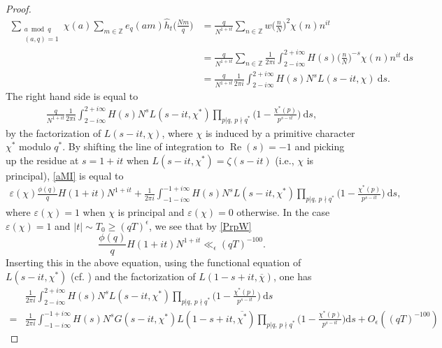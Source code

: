 \documentclass[12pt]{amsart}
\theoremstyle{definition}
\theoremstyle{plain}
\theoremstyle{remark}
\numberwithin{equation}{section}
\numberwithin{theorem}{section}
\renewcommand{\Re}{\operatorname{Re}}
\numberwithin{equation}{section}
\begin{document}
\begin{proof}
		\begin{align*}
			\sum_{\substack{a \bmod q \\ (a, q)=1}}\chi(a)\sum_{m \in \mathbb {Z}}e_q(am)\hat{h}_{t}\bigg(\frac{Nm}{q}\bigg)&=\frac{q}{N^{1+it}}\sum_{n \in \mathbb {Z}}w\bigg(\frac{n}{N}\bigg)^{2}\chi(n)n^{it}
			\\
			&=\frac{q}{N^{1+it}}\sum_{n \in \mathbb {Z}}\frac{1}{2\pi i}\int_{2-i\infty }^{2+i\infty}H(s)\bigg(\frac{n}{N}\bigg)^{-s}\chi(n)n^{it}\:\mathrm{d}s \\
			&= \frac{q}{N^{1+it}}\frac{1}{2\pi i}\int_{2-i \infty }^{2+i\infty}H(s)N^{s}L(s-it, \chi)\:\mathrm{d}s.
		\end{align*}
		The right hand side is equal to 
		\begin{align}\label{aMI}
			\frac{q}{N^{1+it}}\frac{1}{2\pi i}\int_{2-i \infty}^{2+i \infty}H(s)N^{s}L(s-it, \chi^{*})\prod_{p | q,\, p\nmid q^{*}}\bigg(1-\frac{\chi^{*}(p)}{p^{s-it}}\bigg)\:\mathrm{d}s,
		\end{align}
		by the factorization of $L(s-it, \chi)$, where $\chi$ is induced by a primitive character $\chi^{*}$ modulo $q^{*}$.
		By shifting the line of integration to $\Re(s) = -1$ and picking up the residue at $s = 1 + it$ when $L(s-it, \chi^{*}) = \zeta(s-it)$ (i.e., $\chi$ is principal), \eqref{aMI} is equal to 
		\begin{align*}
			\varepsilon(\chi)\frac{\phi(q)}{q}H(1+it)N^{1+it}+
			\frac{1}{2\pi i}\int_{-1-i \infty}^{-1+i \infty}H(s)N^{s}L(s-it, \chi^{*})\prod_{p | q,\, p\nmid q^{*}}\bigg(1-\frac{\chi^{*}(p)}{p^{s-it}}\bigg)\:\mathrm{d}s,
		\end{align*}
		where $\varepsilon(\chi)=1$ when $\chi$ is principal and $\varepsilon(\chi)=0$ otherwise. In the case $\varepsilon(\chi)=1$ and $|t|\sim T_{0}\geq (qT)^{\epsilon}$, we see that by \eqref{PrpW}
		\[\frac{\phi(q)}{q}H(1+it)N^{1+it} \ll_{\epsilon}(qT)^{-100}.\]
		Inserting this in the above equation, using the functional equation of $L(s-it, \chi^{*})$ (cf. \cite[Chapter 9]{DavenportBook}) and the factorization of $L(1-s+it, \overline{\chi})$, one has
		\begin{align*}
			&\frac{1}{2\pi i}\int_{2-i \infty}^{2+i \infty}H(s)N^{s}L(s-it, \chi^{*})\prod_{p | q,\, p\nmid q^{*}}\bigg(1-\frac{\chi^{*}(p)}{p^{s-it}}\bigg)\:\mathrm{d}s
			\\
			=&
			\frac{1}{2\pi i}\int_{-1-i\infty}^{-1+i\infty}H(s)N^{s}G(s-it,\chi^{*})L(1-s+it, \overline{\chi^{*}})\prod_{p | q,\, p\nmid q^{*}}\bigg(1-\frac{\chi^{*}(p)}{p^{s-it}}\bigg)\mathrm{d}s+O_{\epsilon}((qT)^{-100})

\end{align*}
\end{proof}
\end{document}
